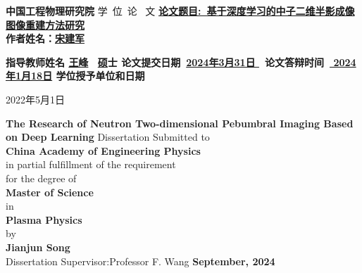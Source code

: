 



\begin{center}%
		\quad \vskip 48pt
		\songti {}\textbf{中国工程物理研究院}
		\vskip 22pt
		\vskip 12pt
		\songti {} 学\  位\  论 \  文
		\vskip 24pt
		  {\bf\kaishu \underline{\quad 论文题目:\ 基于深度学习的中子二维半影成像图像重建方法研究\quad}}\\ 
		\vskip 32pt
		{\bf \songti {}作者姓名：\underline{宋建军}}
		\vskip 32pt
		\end{center}
\begin{flushleft}
		\bf\kaishu\fontsize{14}{14}
		{ \quad 指导教师姓名   \underline{\qquad\qquad\quad\qquad\qquad\quad\qquad 王峰\qquad\quad\qquad\qquad\quad\qquad\qquad }}
		\vskip 24pt
		\ \underline{\qquad 硕\qquad}士\qquad{}\underline{\qquad\quad}
		\vskip 24pt
		\quad 论文提交日期\ \underline{2024年3月31日 }\qquad\qquad \ 论文答辩时间\ \underline{ \quad2024年1月18日\quad}
		\vskip 24pt
\quad 学位授予单位和日期\underline{\qquad\qquad{}\qquad\qquad\qquad\quad}\\
\vskip 24pt
		\qquad\qquad\qquad\qquad\qquad\qquad\qquad\qquad{}\underline{\qquad\qquad\qquad\qquad\qquad }
	
\end{flushleft}

\begin{center}
\kaishu{}
\vskip 18pt
2022年5月1日
\end{center}
\newpage
\begin{center}%
         \quad \vskip 60pt
		{\bf   {}The Research of Neutron Two-dimensional Pebumbral Imaging Based on Deep Learning}
		\vskip 20pt
		\vskip 20pt
		  Dissertation Submitted to\\
		{\bf {} China Academy of Engineering Physics}\\
		in partial fulfillment of the requirement \\
		for the degree of\\
		{\bf {}Master of Science}\\
		\vskip 16pt 
		\zihao{3}in\\
		{\bf {} Plasma Physics}\\
         \vskip 20pt
         by\\
         {\bf {} Jianjun Song}\\
         \vskip 24pt
         {Dissertation Supervisor:\qquad\quad\qquad	Professor F. Wang}
      \vskip 48pt
      {\bf {} September, 2024}
		 
		
		
		\end{center}


